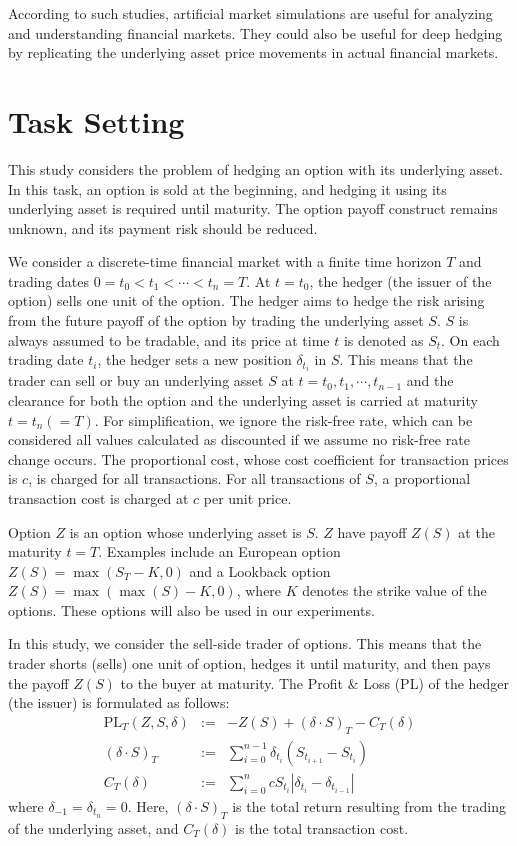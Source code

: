 According to such studies, artificial market simulations are useful for analyzing and understanding financial markets.
They could also be useful for deep hedging by replicating the underlying asset price movements in actual financial markets.

\section{Task Setting}
This study considers the problem of hedging an option with its underlying asset.
In this task, an option is sold at the beginning, and hedging it using its underlying asset is required until maturity.
The option payoff construct remains unknown, and its payment risk should be reduced.

We consider a discrete-time financial market with a finite time horizon $T$ and trading dates $0=t_0 < t_1 < \cdots < t_n = T$.
At $t=t_0$, the hedger (the issuer of the option) sells one unit of the option.
The hedger aims to hedge the risk arising from the future payoff of the option by trading the underlying asset $S$.
$S$ is always assumed to be tradable, and its price at time $t$ is denoted as $S_t$.
On each trading date $t_i$, the hedger sets a new position $\delta_{t_i}$ in $S$.
This means that the trader can sell or buy an underlying asset $S$ at $t=t_0, t_1, \cdots, t_{n-1}$ and the clearance for both the option and the  underlying asset is carried at maturity $t=t_n (=T)$.
For simplification, we ignore the risk-free rate, which can be considered all values calculated as discounted if we assume no risk-free rate change occurs.
The proportional cost, whose cost coefficient for transaction prices is $c$, is charged for all transactions.
For all transactions of $S$, a proportional transaction cost is charged at $c$ per unit price.

Option $Z$ is an option whose underlying asset is $S$.
$Z$ have payoff $Z(S)$ at the maturity $t=T$.
Examples include an European option $Z(S) = \max(S_T-K, 0)$ and a Lookback option $Z(S) = \max(\max(S)- K, 0)$, where $K$ denotes the strike value of the options.
These options will also be used in our experiments.

In this study, we consider the sell-side trader of options.
This means that the trader shorts (sells) one unit of option, hedges it until maturity, and then pays the payoff $Z(S)$ to the buyer at maturity.
The Profit \& Loss (PL) of the hedger (the issuer) is formulated as follows:
\begin{eqnarray}
    \mathrm{PL}_T (Z, S, \delta) &:=& -Z(S) + (\delta\cdot S)_T - C_T (\delta)\label{eq:pl}\\
    (\delta\cdot S)_T &:=& \sum_{i=0}^{n-1} \delta_{t_i} (S_{t_{i+1}} - S_{t_i}) \\
    C_T (\delta) &:=& \sum_{i=0}^{n} cS_{t_i}|\delta_{t_i} - \delta_{t_{i-1}}|
\end{eqnarray}
where $\delta_{-1} = \delta_{t_n} = 0$.
Here, $(\delta\cdot S)_T$ is the total return resulting from the trading of the underlying asset, and $C_T (\delta)$ is the total transaction cost.

